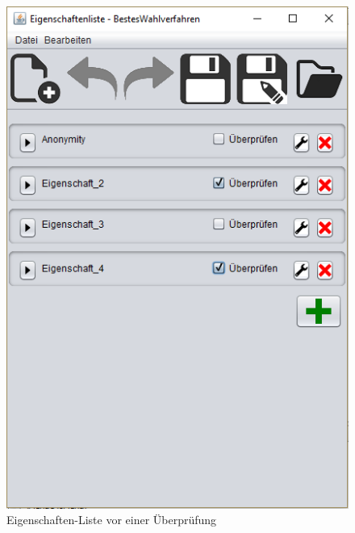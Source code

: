 \documentclass[a4paper]{scrreprt}
\begin{document}
\begin{figure}[H]
\begin{minipage}{.5\textwidth}
  \centering
  \includegraphics[scale=0.5]{Eigenschaften-Liste.png}
  \caption{Eigenschaften-Liste vor einer Überprüfung}
  \label{Eigenschaften-Liste-vor}
\end{minipage}
\begin{minipage}{.5\textwidth}
  \centering

\end{minipage}
\end{figure}
\end{document}
